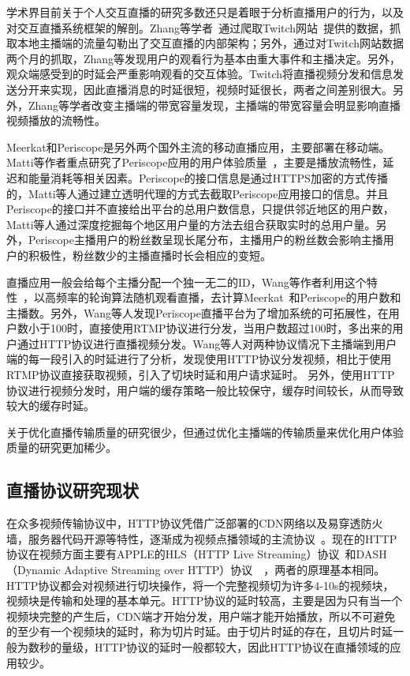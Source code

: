 学术界目前关于个人交互直播的研究多数还只是着眼于分析直播用户的行为，以及对交互直播系统框架的解剖。Zhang等学者~\cite{zhang2015crowdsourced}通过爬取Twitch网站~\cite{Twitch}提供的数据，抓取本地主播端的流量勾勒出了交互直播的内部架构；另外，通过对Twitch网站数据两个月的抓取，Zhang等发现用户的观看行为基本由重大事件和主播决定。另外，观众端感受到的时延会严重影响观看的交互体验。Twitch将直播视频分发和信息发送分开来实现，因此直播消息的时延很短，视频时延很长，两者之间差别很大。另外，Zhang等学者改变主播端的带宽容量发现，主播端的带宽容量会明显影响直播视频播放的流畅性。

Meerkat和Periscope是另外两个国外主流的移动直播应用，主要部署在移动端。Matti等作者重点研究了Periscope应用的用户体验质量~\cite{siekkinen2016first}，主要是播放流畅性，延迟和能量消耗等相关因素。Periscope的接口信息是通过HTTPS加密的方式传播的，Matti等人通过建立透明代理的方式去截取Periscope应用接口的信息。并且Periscope的接口并不直接给出平台的总用户数信息，只提供邻近地区的用户数，Matti等人通过深度挖掘每个地区用户量的方法去组合获取实时的总用户量。另外，Periscope主播用户的粉丝数呈现长尾分布，主播用户的粉丝数会影响主播用户的积极性，粉丝数少的主播直播时长会相应的变短。

直播应用一般会给每个主播分配一个独一无二的ID，Wang等作者利用这个特性~\cite{wang2016anatomy}，以高频率的轮询算法随机观看直播，去计算Meerkat~\cite{Meerkat}和Periscope的用户数和主播数。另外，Wang等人发现Periscope直播平台为了增加系统的可拓展性，在用户数小于100时，直接使用RTMP协议进行分发，当用户数超过100时，多出来的用户通过HTTP协议进行直播视频分发。Wang等人对两种协议情况下主播端到用户端的每一段引入的时延进行了分析，发现使用HTTP协议分发视频，相比于使用RTMP协议直接获取视频，引入了切块时延和用户请求延时。 另外，使用HTTP协议进行视频分发时，用户端的缓存策略一般比较保守，缓存时间较长，从而导致较大的缓存时延。

关于优化直播传输质量的研究很少，但通过优化主播端的传输质量来优化用户体验质量的研究更加稀少。

\subsection{直播协议研究现状}
在众多视频传输协议中，HTTP协议凭借广泛部署的CDN网络以及易穿透防火墙，服务器代码开源等特性，逐渐成为视频点播领域的主流协议~\cite{li2013two}。现在的HTTP协议在视频方面主要有APPLE的HLS（HTTP Live Streaming）协议~\cite{Apple}和DASH（Dynamic Adaptive Streaming over HTTP）协议~\cite{stockhammer2011dynamic}~\cite{sodagar2011mpeg}，两者的原理基本相同。HTTP协议都会对视频进行切块操作，将一个完整视频切为许多4-10s的视频块，视频块是传输和处理的基本单元。HTTP协议的延时较高，主要是因为只有当一个视频块完整的产生后，CDN端才开始分发，用户端才能开始播放，所以不可避免的至少有一个视频块的延时，称为切片时延。由于切片时延的存在，且切片时延一般为数秒的量级，HTTP协议的延时一般都较大，因此HTTP协议在直播领域的应用较少。

